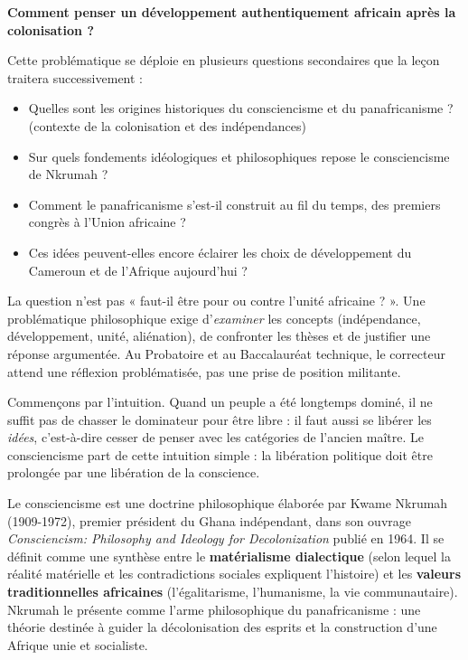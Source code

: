 \documentclass[11pt]{article}
\newcommand{\cle}[1]{{\popxbold\color{popdark}#1}}
\newcounter{popsec}
\newcounter{popsub}
\newcommand{\courssub}[1]{%
  \stepcounter{popsub}%
  \par\vspace{9pt}\noindent{\popxbold\fontsize{11.5}{13}\selectfont\color{popink}{\color{poporange}\thepopsec.\thepopsub}\hspace{6pt}#1}\par\nopagebreak\vspace{4pt}
}
\begin{document}
\begin{center}
\textbf{Comment penser un développement authentiquement africain après la colonisation ?}
\end{center}

Cette problématique se déploie en plusieurs questions secondaires que la leçon traitera successivement :
\begin{itemize}
\item Quelles sont les origines historiques du consciencisme et du panafricanisme ? (contexte de la colonisation et des indépendances)
\item Sur quels fondements idéologiques et philosophiques repose le consciencisme de Nkrumah ?
\item Comment le panafricanisme s'est-il construit au fil du temps, des premiers congrès à l'Union africaine ?
\item Ces idées peuvent-elles encore éclairer les choix de développement du Cameroun et de l'Afrique aujourd'hui ?
\end{itemize}

\begin{attention}
La question n'est pas « faut-il être pour ou contre l'unité africaine ? ». Une problématique philosophique exige d'\emph{examiner} les concepts (indépendance, développement, unité, aliénation), de confronter les thèses et de justifier une réponse argumentée. Au Probatoire et au Baccalauréat technique, le correcteur attend une réflexion problématisée, pas une prise de position militante.
\end{attention}

\courssub{Définition du consciencisme}

Commençons par l'intuition. Quand un peuple a été longtemps dominé, il ne suffit pas de chasser le dominateur pour être libre : il faut aussi se libérer les \emph{idées}, c'est-à-dire cesser de penser avec les catégories de l'ancien maître. Le consciencisme part de cette intuition simple : la libération politique doit être prolongée par une libération de la \cle{conscience}.

\begin{definition}[Le consciencisme]
Le \cle{consciencisme} est une doctrine philosophique élaborée par Kwame Nkrumah (1909-1972), premier président du Ghana indépendant, dans son ouvrage \emph{Consciencism: Philosophy and Ideology for Decolonization} publié en 1964. Il se définit comme une synthèse entre le \textbf{matérialisme dialectique} (selon lequel la réalité matérielle et les contradictions sociales expliquent l'histoire) et les \textbf{valeurs traditionnelles africaines} (l'égalitarisme, l'humanisme, la vie communautaire). Nkrumah le présente comme \og l'arme philosophique du panafricanisme \fg{} : une théorie destinée à guider la décolonisation des esprits et la construction d'une Afrique unie et socialiste.
\end{definition}
\end{document}
